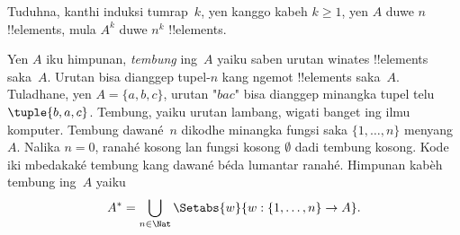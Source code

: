 \documentclass[../../../include/open-logic-section]{subfiles}
\begin{document}
\begin{prob}
Tuduhna, kanthi induksi tumrap~$k$, yen kanggo kabeh $k \ge 1$,
yen $A$ duwe $n$ !!{element}s, mula $A^k$ duwe
$n^k$ !!{element}s.
\end{prob}

\begin{ex}
Yen $A$ iku himpunan, \emph{tembung} ing~$A$ yaiku saben
urutan winates !!{element}s saka~$A$. Urutan bisa dianggep
tupel-$n$ kang ngemot !!{element}s saka~$A$.
Tuladhane, yen $A = \{a, b, c\}$, urutan "$bac$" bisa
dianggep minangka tupel telu~$\tuple{b, a, c}$.
Tembung, yaiku urutan lambang, wigati banget ing ilmu komputer.
Tembung dawané~$n$ dikodhe minangka fungsi saka
$\{1,\ldots,n\}$ menyang~$A$. Nalika $n=0$, ranahé kosong
lan fungsi kosong $\emptyset$ dadi tembung kosong. Kode
iki mbedakaké tembung kang dawané béda lumantar ranahé.
Himpunan kabèh tembung ing~$A$ yaiku
\[
A^* = \bigcup_{n\in\Nat} \Setabs{w}{w:\{1,\ldots,n\}\to A}.
\]
\end{ex}
\end{document}
